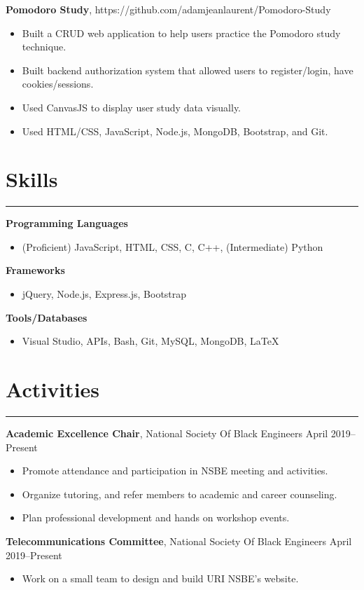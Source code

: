 \documentclass[11pt]{article}
\newcommand{\resumesection}[1]{\vspace{-0.2cm}\section*{#1}\vspace{-0.2cm}\hrule\vspace{0.2cm}}
\begin{document}
\textbf{Pomodoro Study}, https://github.com/adamjeanlaurent/Pomodoro-Study
\begin{itemize}
	\item Built a CRUD web application to help users practice the Pomodoro study technique.
	\item  Built backend authorization system that allowed users to register/login, have cookies/sessions.
	\item Used CanvasJS to display user study data visually.
	\item Used HTML/CSS, JavaScript, Node.js, MongoDB, Bootstrap, and Git.
\end{itemize}

\resumesection{Skills}

\textbf{Programming Languages}
\begin{itemize}
	\item (Proficient) JavaScript, HTML, CSS, C, C++, (Intermediate) Python 
\end{itemize}

\textbf{Frameworks}
\begin{itemize}
	\item jQuery, Node.js, Express.js, Bootstrap
\end{itemize}

\textbf{Tools/Databases}
\begin{itemize}
	\item Visual Studio, APIs, Bash, Git, MySQL, MongoDB, \LaTeX
\end{itemize}

\resumesection{Activities}

\textbf{Academic Excellence Chair}, National Society Of Black Engineers \hfill April 2019--Present
\begin{itemize}
	\item Promote attendance and participation in NSBE meeting and activities.
	\item Organize tutoring, and refer members to academic and career counseling.
	\item Plan professional development and hands on workshop events.
\end{itemize}

\textbf{Telecommunications Committee}, National Society Of Black Engineers \hfill April 2019--Present
\begin{itemize}
	\item Work on a small team to design and build URI NSBE's website.
\end{itemize}
\end{document}

